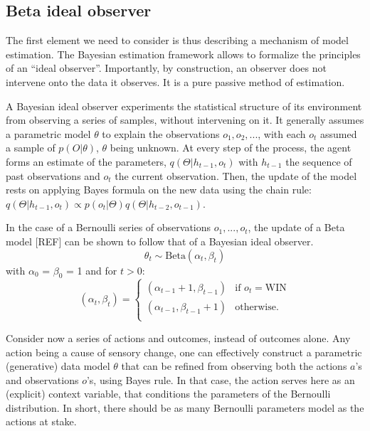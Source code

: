 \documentclass[10pt,letterpaper]{article}
\begin{document}
\subsection{Beta ideal observer}




The first element we need to consider is thus describing a mechanism of model estimation. The Bayesian estimation framework allows to formalize the principles of an ``ideal observer''.
Importantly, by construction, an observer does not intervene onto the data it observes. It is a pure passive method of estimation.    

A Bayesian ideal observer \cite{geisler1989sequential} experiments the statistical structure of its environment from observing a series of samples, without intervening on it. It generally assumes a parametric model $\theta$ to explain the observations $o_1, o_2, ...$, with each $o_t$ assumed a sample of $p(O|\theta)$, $\theta$ being unknown. At every step of the process, the agent forms an estimate of the parameters, $q(\Theta|h_{t-1}, o_t)$ with $h_{t-1}$ the sequence of past observations and $o_t$ the current observation. Then, the update of the model rests on applying Bayes formula on the new data using the chain rule: $q(\Theta|h_{t-1}, o_t) \propto p(o_t|\Theta) q(\Theta|h_{t-2}, o_{t-1})$.

In the case of a Bernoulli series of observations $o_1,...,o_t$, the update of a Beta model [REF] can be shown to follow that of a Bayesian ideal observer. 
\begin{equation}
    \theta_t \sim \text{Beta}(\alpha_t,\beta_t)
\end{equation}
with $\alpha_0$ = $\beta_0$ = 1 and for $t>0$:
\begin{equation}
    (\alpha_t,\beta_t) = \left\{
    \begin{array}{ll}
        (\alpha_{t-1}+1,\beta_{t-1}) & \mbox{if $o_t=\text{WIN}$} \\
        (\alpha_{t-1},\beta_{t-1}+1) & \mbox{otherwise}. \\
    \end{array}
\right.
\end{equation}

Consider now a series of actions and outcomes, instead of outcomes alone. 
Any action being a cause of sensory change, one can effectively construct a parametric (generative) data model $\theta$ that can be refined from observing both the actions $a$'s and observations $o$'s, using Bayes rule. In that case, %
the action serves here as an (explicit) context variable, that conditions the parameters of the Bernoulli distribution. In short, there should be as many Bernoulli parameters model as the actions at stake. 
\end{document}

